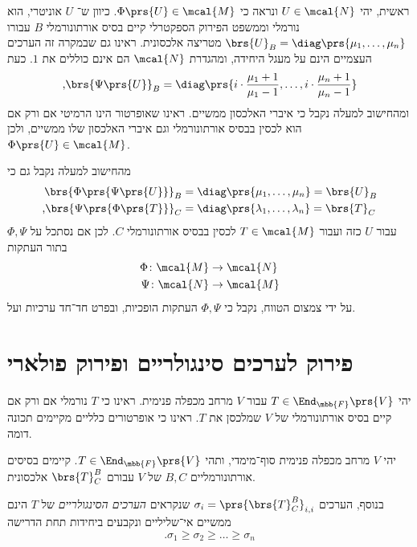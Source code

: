 \documentclass[a4paper,10pt,twoside,openany]{book}
\begin{document}
\begin{solution}
\begin{enumerate}
ראשית, יהי
$U \in \mcal{N}$
ונראה כי
$\Phi\prs{U} \in \mcal{M}$.
כיוון ש־%
$U$
אוניטרי, הוא נורמלי וממשפט הפירוק הספקטרלי קיים בסיס אורתונורמלי
$B$
עבורו
$\brs{U}_B = \diag\prs{\mu_1, \ldots, \mu_n}$
מטריצה אלכסונית. ראינו גם שבמקרה זה הערכים העצמיים הינם על מעגל היחידה, ומהגדרת
$\mcal{N}$
הם אינם כוללים את
$1$.
כעת
\[\text{,} \brs{\Psi\prs{U}}_B = \diag\prs{i \cdot \frac{\mu_1 + 1}{\mu_1 - 1}, \ldots, i \cdot \frac{\mu_n + 1}{\mu_n - 1}}\]
ומהחישוב למעלה נקבל כי איברי האלכסון ממשיים. ראינו שאופרטור הינו הרמיטי אם ורק אם הוא לכסין בבסיס אורתונורמלי וגם איברי האלכסון שלו ממשיים, ולכן
$\Phi\prs{U} \in \mcal{M}$.

מהחישוב למעלה נקבל גם כי
\begin{align*}
\brs{\Phi\prs{\Psi\prs{U}}}_B &= \diag\prs{\mu_1, \ldots, \mu_n} = \brs{U}_B \\
\text{,} \brs{\Psi \prs{\Phi\prs{T}}}_C &= \diag\prs{\lambda_1, \ldots, \lambda_n} = \brs{T}_C 
\end{align*}
עבור
$U$
כזה ועבור
$T \in \mcal{M}$
לכסין בבסיס אורתונורמלי
$C$.
לכן אם נסתכל על
$\Phi, \Psi$
בתור העתקות
\begin{align*}
\Phi \colon \mcal{M} &\to \mcal{N} \\
\Psi \colon \mcal{N} &\to \mcal{M}
\end{align*}
על ידי צמצום הטווח, נקבל כי
$\Phi, \Psi$
העתקות הופכיות, ובפרט חד־חד ערכיות ועל.

\end{enumerate}
\end{solution}

\section{פירוק לערכים סינגולריים ופירוק פולארי}

יהי
$T \in \End_\mbb{F}\prs{V}$
עבור
$V$
מרחב מכפלה פנימית. ראינו כי
$T$
נורמלי אם ורק אם קיים בסיס אורתונורמלי של
$V$
שמלכסן את
$T$.
ראינו כי אופרטורים כלליים מקיימים תכונה דומה.

\begin{theorem}
יהי
$V$
מרחב מכפלה פנימית סוף־מימדי, ותהי
$T \in \End_{\mbb{F}}\prs{V}$.
קיימים בסיסים אורתונורמליים
$B,C$
של
$V$
עבורם
$\brs{T}^B_C$
אלכסונית.

בנוסף, הערכים
$\sigma_i = \prs{\brs{T}^B_C}_{i,i}$
שנקראים
\emph{הערכים הסינגולריים}
של
$T$
הינם ממשיים אי־שליליים ונקבעים ביחידות תחת הדרישה
\[\text{.} \sigma_1 \geq \sigma_2 \geq \ldots \geq \sigma_n\]
\end{theorem}
\end{document}
